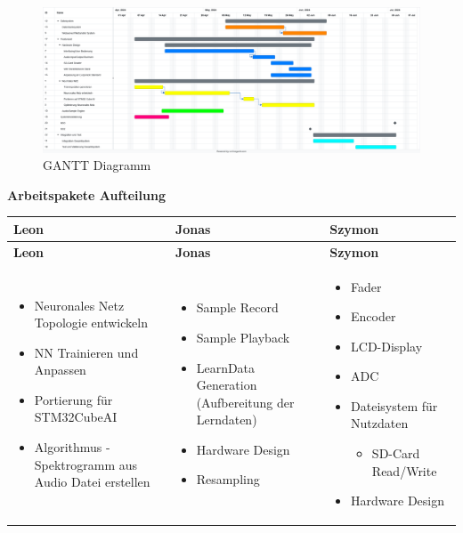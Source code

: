     \begin{figure}[H]
	\centering
	\includegraphics[width=1.0\textwidth]{images/04_spezifikation/gantt.png}
	\caption{GANTT Diagramm}
	\label{fig:gantt}
\end{figure}

\textbf{Arbeitspakete Aufteilung} \\

\begin{longtable}[c]{|p{5cm}|p{5cm}|p{5cm}|}
	\hline
	\textbf{Leon} & \textbf{Jonas} & \textbf{Szymon}\\
	\hline
	\endfirsthead
	\hline
	\textbf{Leon} & \textbf{Jonas} & \textbf{Szymon}\\
	\hline
	\endhead
	\hline
	\endfoot
	\hline
	\endlastfoot
	
	\begin{itemize}[left=0pt]
		\item Neuronales Netz Topologie entwickeln
		\item NN Trainieren und Anpassen
		\item Portierung für STM32CubeAI
		\item Algorithmus - Spektrogramm aus Audio Datei erstellen
	\end{itemize} &
	\begin{itemize}[left=0pt]
		\item Sample Record
		\item Sample Playback
		\item LearnData Generation (Aufbereitung der Lerndaten)
		\item Hardware Design
		\item Resampling
	\end{itemize} &
	\begin{itemize}[left=0pt]
		\item Fader
		\item Encoder
		\item LCD-Display
		\item ADC
		\item Dateisystem für Nutzdaten
		\begin{itemize}[label=--, left=1em]
			\item SD-Card Read/Write
		\end{itemize}
		\item Hardware Design
	\end{itemize} \\
	\hline
\end{longtable}